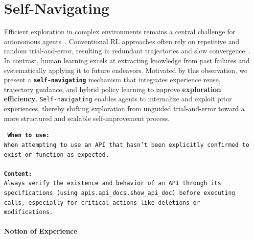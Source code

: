 \section{Self-Navigating}
\label{sec:self-navigating}


Efficient exploration in complex environments remains a central challenge for autonomous agents~\citep{lu2024intelligent, qiao2024agent}. Conventional RL approaches often rely on repetitive and random trial-and-error, resulting in redundant trajectories and slow convergence~\citep{burda2018exploration}. In contrast, human learning excels at extracting knowledge from past failures and systematically applying it to future endeavors. Motivated by this observation, we present a \textbf{\texttt{self-navigating}} mechanism that integrates experience reuse, trajectory guidance, and hybrid policy learning to improve \textbf{exploration efficiency}. \texttt{Self-navigating} enables agents to internalize and exploit prior experiences, thereby shifting exploration from unguided trial-and-error toward a more structured and scalable self-improvement process.


\begin{center}
\begin{tcolorbox}[
  title=An example of \emph{experience} for AppWorld,
  width=16cm,
  boxrule=0.45mm,
  fonttitle=\bfseries,
  enhanced,
  sharp corners,
  colback=white,
  colframe=black!70,
  arc=0mm,
  pad at break=2mm,
  outer arc=0mm
]
\texttt{%
\textbf{When to use:} \\ 
When attempting to use an API that hasn't been explicitly confirmed to exist or function as expected. \\
\\
\textbf{Content:} \\
Always verify the existence and behavior of an API through its specifications (using apis.api\_docs.show\_api\_doc) before executing calls, especially for critical actions like deletions or modifications.
}
\end{tcolorbox}
\label{fig:experience notion}
\end{center}

\paragraph{Notion of Experience}

